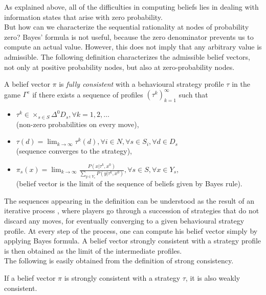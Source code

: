 As explained above,  all of the difficulties in computing beliefs lies in dealing with information states that arise with zero probability. \\
But how can we characterize the sequential rationality at nodes of  probability zero?  Bayes' formula is not useful, because the zero denominator prevents us to compute an actual value.  However, this does not imply that any arbitrary value is admissible.  The following definition characterizes the admissible belief vectors, not only at positive probability nodes, but also at zero-probability nodes.
\begin{definition}
A belief vector $\pi$ is \emph{fully consistent} with a behavioural strategy profile $\tau$ in the game $\Gamma^e$ if there exists a sequence of profiles $(\tau^k)_{k = 1}^\infty$ such that
\begin{itemize}
\item $\tau^k \in \times_{s \in S} \Delta^0 D_s, \forall k = 1,2,\ldots$ \\ (non-zero probabilities on every move), 
\item  $\tau(d) = \lim_{k \rightarrow \infty} \tau^k(d),  \forall i \in N, \forall s \in S_i, \forall d \in D_s $\\
 (sequence converges to the strategy), 
\item $ \pi_s(x) = \lim_{k \rightarrow \infty} \frac{P(x | \tau^k, x^0)}{\sum_{y \in Y_s}P(y| \tau^k, x^0)}, \forall s \in S, \forall x \in Y_s, $\\
(belief vector is the limit of the sequence of beliefs given by Bayes rule).
\end{itemize}
\label{ch4:def:StrongCons}
\end{definition}

The sequences appearing in the definition can be understood as the result of an iterative process , where players go through a succession of strategies that do not discard any moves, for eventually converging to a given behavioural strategy profile. At every step of the process, one can compute his belief vector simply by applying Bayes formula. A belief vector strongly consistent with a strategy profile is then obtained as the limit of the intermediate profiles. \\

The following is easily obtained from the definition of strong consistency.
\begin{proposition}
If a belief vector $\pi$ is strongly consistent with  a strategy $\tau$, it is also weakly consistent.
\end{proposition}

